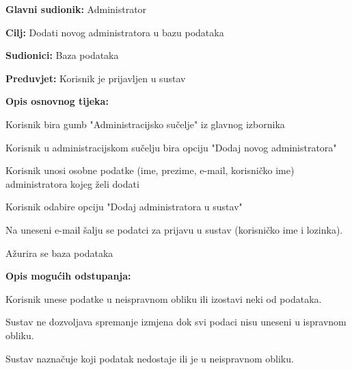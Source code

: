 					\noindent {}
					\begin{packed_item}
	
						\item \textbf{Glavni sudionik: } Administrator
						\item  \textbf{Cilj:} Dodati novog administratora u bazu podataka
						\item  \textbf{Sudionici:} Baza podataka
						\item  \textbf{Preduvjet:} Korisnik je prijavljen u sustav
						\item  \textbf{Opis osnovnog tijeka:}
						
						\item[] \begin{packed_enum}
	
							\item Korisnik bira gumb "Administracijsko sučelje" iz glavnog izbornika
							\item Korisnik u administracijskom sučelju bira opciju "Dodaj novog administratora"
							\item Korisnik unosi osobne podatke (ime, prezime, e-mail, korisničko ime) administratora kojeg želi dodati
							\item Korisnik odabire opciju "Dodaj administratora u sustav"
							\item Na uneseni e-mail šalju se podatci za prijavu u sustav (korisničko ime i lozinka).
							\item Ažurira se baza podataka
							

					
						\end{packed_enum}

						\item  \textbf{Opis mogućih odstupanja:}
						
						\item[] \begin{packed_item}
							
							\item[3.a]  Korisnik unese podatke u neispravnom obliku ili izostavi neki od podataka.
							\item[] \begin{packed_enum}
								
								\item Sustav ne dozvoljava spremanje izmjena dok svi podaci nisu uneseni u ispravnom obliku.
								\item Sustav naznačuje koji podatak nedostaje ili je u neispravnom obliku.
								

\end{packed_enum}
\end{packed_item}
\end{packed_item}
